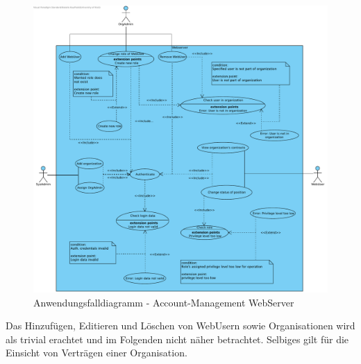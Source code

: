 \begin{figure}[h]
    \centering
    \includegraphics[width=\linewidth]{img/diagrams/Acc_Management_Web.pdf}
    \caption{Anwendungsfalldiagramm - Account-Management WebServer}
    \label{fig:anwendungsfalldiagramm-acc}
\end{figure}

Das Hinzufügen, Editieren und Löschen von WebUsern sowie Organisationen wird als trivial erachtet und im Folgenden nicht näher betrachtet. Selbiges gilt für die Einsicht von Verträgen einer Organisation.

